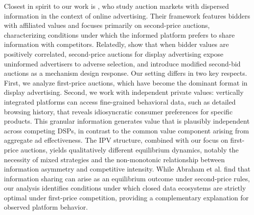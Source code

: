 \documentclass[11pt]{article}
\theoremstyle{plain}
\theoremstyle{definition}
\theoremstyle{plain}
\theoremstyle{plain}
\theoremstyle{plain}
\theoremstyle{plain}
\numberwithin{equation}{section}
\begin{document}
\vspace{2mm}
\noindent Closest in spirit to our work is \textcite{abrahamPeachesLemonsCookies2020}, who study auction markets with dispersed information in the context of online advertising. Their framework features bidders with affiliated values and focuses primarily on second-price auctions, characterizing conditions under which the informed platform prefers to share information with competitors. Relatedly, \textcite{arnostiAdverseSelectionAuction2016} show that when bidder values are positively correlated, second-price auctions for display advertising expose uninformed advertisers to adverse selection, and introduce modified second-bid auctions as a mechanism design response. Our setting differs in two key respects. First, we analyze first-price auctions, which have become the dominant format in display advertising. Second, we work with independent private values: vertically integrated platforms can access fine-grained behavioral data, such as detailed browsing history, that reveals idiosyncratic consumer preferences for specific products. This granular information generates value that is plausibly independent across competing DSPs, in contrast to the common value component arising from aggregate ad effectiveness. The IPV structure, combined with our focus on first-price auctions, yields qualitatively different equilibrium dynamics, notably the necessity of mixed strategies and the non-monotonic relationship between information asymmetry and competitive intensity. While Abraham et al. find that information sharing can arise as an equilibrium outcome under second-price rules, our analysis identifies conditions under which closed data ecosystems are strictly optimal under first-price competition, providing a complementary explanation for observed platform behavior.\par
\vspace{2mm}
\end{document}
